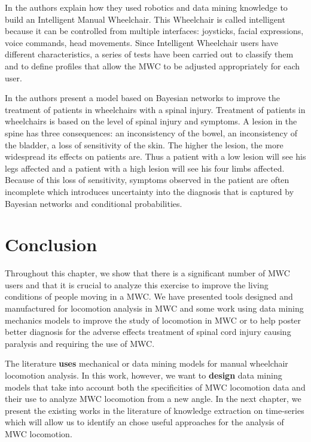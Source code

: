 In \cite{faria2012patient} the authors explain how they used robotics and data mining knowledge to build an Intelligent Manual Wheelchair. This Wheelchair is called intelligent because it can be controlled from multiple interfaces: joysticks, facial expressions, voice commands, head movements.  Since Intelligent Wheelchair users have different characteristics, a series of tests have been carried out to classify them and to define profiles that allow the MWC to be adjusted appropriately for each user.

In \cite{athanasiou2009bayesian} the authors present a model based on Bayesian networks to improve the treatment of patients in wheelchairs with a spinal injury. Treatment of patients in wheelchairs is based on the level of spinal injury and symptoms. A lesion in the spine has three consequences: an inconsistency of the bowel, an inconsistency of the bladder, a loss of sensitivity of the skin. The higher the lesion, the more widespread its effects on patients are. Thus a patient with a low lesion will see his legs affected and a patient with a high lesion will see his four limbs affected. Because of this loss of sensitivity, symptoms observed in the patient are often incomplete which introduces uncertainty into the diagnosis that is captured by Bayesian networks and conditional probabilities.





\section{Conclusion}



Throughout this chapter, we show that there is a significant number of MWC users and that it is crucial to analyze this exercise to improve the living conditions of people moving in a MWC. We have presented tools designed and manufactured for locomotion analysis in MWC and some work using data mining mechanics models to improve the study of locomotion in MWC or to help poster better diagnosis for the adverse effects treatment of spinal cord injury causing paralysis and requiring the use of MWC. 


The literature \textbf{uses} mechanical or data mining models for manual wheelchair locomotion analysis.  In this work, however, we want to \textbf{design} data mining models that take into account both the specificities of MWC locomotion data and their use to analyze MWC locomotion from a new angle. In the next chapter, we present the existing works in the literature of knowledge extraction on time-series which will allow us to identify an chose useful approaches for the analysis of MWC locomotion.






